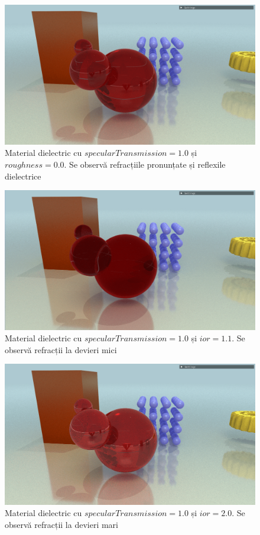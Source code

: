 \documentclass[12pt,a4paper]{report}
\numberwithin{equation}{section} %
\begin{document}
\begin{figure}[!htb]
	\centering
	\includegraphics[width=\textwidth]{pics/demo-trans-1.png}
	\caption{Material dielectric cu $specularTransmission = 1.0$ și $roughness = 0.0$. Se observă refracțiile pronunțate și reflexile dielectrice}
	\label{fig:demo-trans-1}
\end{figure}
\begin{figure}[!htb]
	\centering
	\includegraphics[width=\textwidth]{pics/demo-trans-ior1.1.png}
	\caption{Material dielectric cu $specularTransmission = 1.0$ și $ior = 1.1$. Se observă refracții la devieri mici}
	\label{fig:demo-trans-ior1.1}
\end{figure}
\begin{figure}[!htb]
	\centering
	\includegraphics[width=\textwidth]{pics/demo-trans-ior2.png}
	\caption{Material dielectric cu $specularTransmission = 1.0$ și $ior = 2.0$. Se observă refracții la devieri mari}
	\label{fig:demo-trans-ior2}
\end{figure}
\end{document}
